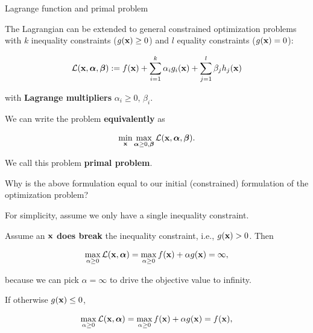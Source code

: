 \documentclass[11pt,compress,t,notes=noshow, xcolor=table]{beamer}
\begin{document}
\begin{vbframe}{Lagrange function and primal problem}

The Lagrangian can be extended to general constrained optimization problems with $k$ inequality constraints ($g(\mathbf{x}) \geq 0$) and $l$ equality constraints ($g(\mathbf{x}) = 0$): 

$$
\mathcal{L}(\mathbf{x}, \bm{\alpha}, \bm{\beta}) := f(\mathbf{x}) + \sum_{i=1}^k \alpha_i g_i(\mathbf{x}) + \sum_{j=1}^l \beta_j h_j(\mathbf{x})
$$

with \textbf{Lagrange multipliers} $\alpha_i\ge 0$, $\beta_i$.

\lz

We can write the problem \textbf{equivalently} as

$$
\min_{\mathbf{x}} \max_{\bm{\alpha}\ge 0, \bm{\beta}}  \mathcal{L}(\mathbf{x}, \bm{\alpha}, \bm{\beta}).
$$

We call this problem \textbf{primal problem}. \\

\vspace*{0.2cm} 

Why is the above formulation equal to our initial (constrained) formulation of the optimization problem? 

\framebreak 

For simplicity, assume we only have a single inequality constraint. 

\vspace*{0.2cm} 

Assume an $\mathbf{x}$ \textbf{does break} the inequality constraint, i.e., $g(\mathbf{x}) > 0$. Then 

\vspace*{-0.5cm} 

\begin{eqnarray*}
	\max_{\alpha \ge 0} \mathcal{L}(\mathbf{x}, \bm{\alpha}) = \max_{\alpha \ge 0} f(\mathbf{x}) +  \alpha g(\mathbf{x}) = \infty,
\end{eqnarray*}

because we can pick $\alpha = \infty$ to drive the objective value to infinity. 

\vspace*{0.2cm} 

If otherwise $g(\mathbf{x}) \le 0$, 

\vspace*{-0.5cm} 

\begin{eqnarray*}
	\max_{\alpha \ge 0} \mathcal{L}(\mathbf{x}, \bm{\alpha}) = \max_{\alpha \ge 0} f(\mathbf{x}) +  \alpha g(\mathbf{x}) = f(\mathbf{x}),
\end{eqnarray*}


\end{vbframe}
\end{document}
